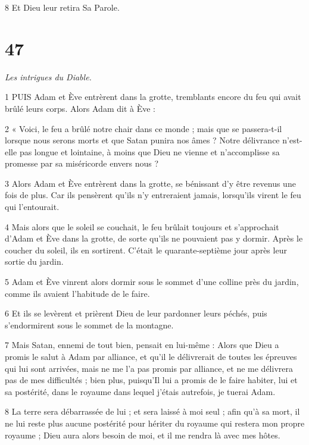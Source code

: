 \par 8 Et Dieu leur retira Sa Parole.

\chapter{47}

\par \textit{Les intrigues du Diable.}

\par 1 PUIS Adam et Ève entrèrent dans la grotte, tremblants encore du feu qui avait brûlé leurs corps. Alors Adam dit à Ève :

\par 2 « Voici, le feu a brûlé notre chair dans ce monde ; mais que se passera-t-il lorsque nous serons morts et que Satan punira nos âmes ? Notre délivrance n’est-elle pas longue et lointaine, à moins que Dieu ne vienne et n’accomplisse sa promesse par sa miséricorde envers nous ?

\par 3 Alors Adam et Ève entrèrent dans la grotte, se bénissant d'y être revenus une fois de plus. Car ils pensèrent qu'ils n'y entreraient jamais, lorsqu'ils virent le feu qui l'entourait.

\par 4 Mais alors que le soleil se couchait, le feu brûlait toujours et s'approchait d'Adam et Ève dans la grotte, de sorte qu'ils ne pouvaient pas y dormir. Après le coucher du soleil, ils en sortirent. C'était le quarante-septième jour après leur sortie du jardin.

\par 5 Adam et Ève vinrent alors dormir sous le sommet d'une colline près du jardin, comme ils avaient l'habitude de le faire.

\par 6 Et ils se levèrent et prièrent Dieu de leur pardonner leurs péchés, puis s'endormirent sous le sommet de la montagne.

\par 7 Mais Satan, ennemi de tout bien, pensait en lui-même : Alors que Dieu a promis le salut à Adam par alliance, et qu'il le délivrerait de toutes les épreuves qui lui sont arrivées, mais ne me l'a pas promis par alliance, et ne me délivrera pas de mes difficultés ; bien plus, puisqu'Il lui a promis de le faire habiter, lui et sa postérité, dans le royaume dans lequel j'étais autrefois, je tuerai Adam.

\par 8 La terre sera débarrassée de lui ; et sera laissé à moi seul ; afin qu'à sa mort, il ne lui reste plus aucune postérité pour hériter du royaume qui restera mon propre royaume ; Dieu aura alors besoin de moi, et il me rendra là avec mes hôtes.

